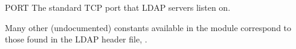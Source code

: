 
\begin{datadesc}{PORT}
The standard TCP port that LDAP servers listen on.
\end{datadesc}


Many other (undocumented) constants available in the module correspond 
to those found in the LDAP header file, .
